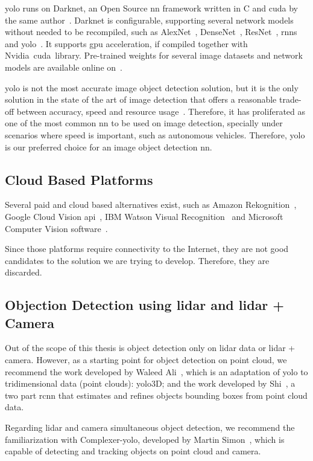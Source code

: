 \ac{yolo} runs on Darknet, an Open Source \ac{nn} framework written in C and \ac{cuda} by the same author~\cite{Redmon2013}. Darknet is configurable, supporting several network models without needed to be recompiled, such as AlexNet~\cite{Krizhevsky2007}, DenseNet~\cite{Huang2017}, ResNet~\cite{He2016}, \acp{rnn}~\cite{Cleeremans1989} and \ac{yolo}~\cite{Redmon2016}. It supports \ac{gpu} acceleration, if compiled together with Nvidia\cp~\ac{cuda}\texttrademark~library. Pre-trained weights for several image datasets and network models are available online on~\cite{Redmon2013}. 

\ac{yolo} is not the most accurate image object detection solution, but it is the only solution in the state of the art of image detection that offers a reasonable trade-off between accuracy, speed and resource usage~\cite{Redmon2018}. Therefore, it has proliferated as one of the most common \ac{nn} to be used on image detection, specially under scenarios where speed is important, such as autonomous vehicles. Therefore, \ac{yolo} is our preferred choice for an image object detection \ac{nn}.

\subsection{Cloud Based Platforms}
Several paid and cloud based alternatives exist, such as Amazon Rekognition~\cite{awsRekognition}, Google Cloud Vision \ac{api}~\cite{googlevision}, IBM Watson Visual Recognition~\cite{watson} and Microsoft Computer Vision software~\cite{azurecv}. 

Since those platforms require connectivity to the Internet, they are not good candidates to the solution we are trying to develop. Therefore, they are discarded.

\subsection{Objection Detection using \ac{lidar} and \ac{lidar} + Camera}
Out of the scope of this thesis is object detection only on \ac{lidar} data or \ac{lidar} + camera. However, as a starting point for object detection on point cloud, we recommend the work developed by Waleed Ali\etal~\cite{Ali2019}, which is an adaptation of \ac{yolo} to tridimensional data (point clouds): \ac{yolo}3D; and the work developed by Shi\etal~\cite{Shi2018}, a two part \ac{rcnn} that estimates and refines objects bounding boxes from point cloud data.

Regarding \ac{lidar} and camera simultaneous object detection, we recommend the familiarization with Complexer-\ac{yolo}, developed by Martin Simon\etal~\cite{Simon2019}, which is capable of detecting and tracking objects on point cloud and camera.



